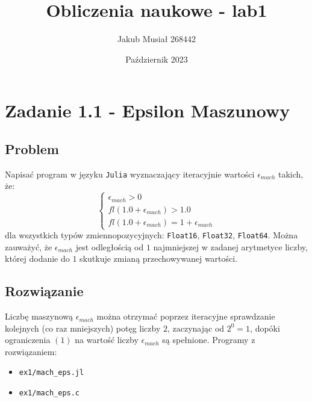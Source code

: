 \documentclass[12pt]{article}
\title{Obliczenia naukowe - lab1}
\author{Jakub Musiał 268442}
\date{Październik 2023}
\begin{document}
\maketitle

\hspace{1cm}

\section*{Zadanie 1.1 -  Epsilon Maszunowy}
    \subsection*{Problem}
    Napisać program w języku \texttt{Julia} wyznaczający iteracyjnie wartości
    $\epsilon_{mach}$ takich, że: \newline
    \begin{equation}
        \left
        \lbrace
        \begin{array}{l}
            \epsilon_{mach} > 0 \\
            fl(1.0 + \epsilon_{mach}) > 1.0 \\
            fl(1.0 + \epsilon_{mach}) = 1 + \epsilon_{mach}
        \end{array}
        \right.
    \end{equation}
    \newline
    dla wszystkich typów zmiennopozycyjnych: \texttt{Float16}, \texttt{Float32}, \texttt{Float64}.
    \newline
    Można zauważyć, że $\epsilon_{mach}$ jest odległością od $1$ najmniejszej w zadanej arytmetyce liczby,
    której dodanie do $1$ skutkuje zmianą przechowywanej wartości.
    \newline

    \subsection*{Rozwiązanie}
        Liczbę maszynową $\epsilon_{mach}$ można otrzymać poprzez iteracyjne sprawdzanie kolejnych
        (co raz mniejszych) potęg liczby $2$, zaczynając od $2^0 = 1$,
        dopóki ograniczenia $(1)$ na wartość liczby $\epsilon_{mach}$ są spełnione.
        \newline\newline
        Programy z rozwiązaniem:
        \begin{itemize}
            \item \texttt{ex1/mach\_eps.jl}
            \item \texttt{ex1/mach\_eps.c}
        \end{itemize}
\end{document}
